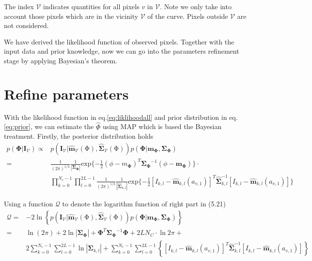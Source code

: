 The index $\mathcal{V}$ indicates quantities for all pixels $v$ in
$\mathcal{V}$. Note we only take into account those pixels which are
in the vicinity $\mathcal{V}$ of the curve. Pixels outside
$\mathcal{V}$ are not considered.

We have derived the likelihood function of observed pixels. Together
with the input data and prior knowledge, now we can go into the parameters
refinement stage by applying Bayesian's theorem.

\section{Refine parameters}
\label{sec:ref}

With the likelihood function in eq.\ref{eq:liklihoodall} and prior distribution in
eq.\ref{eq:prior}, we can estimate the $\hat{\Phi}$ using MAP which is based the
Bayesian treatment.
Firstly, the posterior distribution holds
\begin{align}
\label{eq:costf}
    p(\mathbf{\Phi}|\mathbf{\mathbf{I}}_{\mathcal{V}}) 
    \propto &
    p(\mathbf{\mathbf{I}_{\mathcal{V}}}
    |\hat{\mathbf{\mathbf{m}}}_{\mathcal{V}}(\mathrm{\Phi}),\hat{\mathbf{\mathbf{\Sigma}}}_{\mathcal{V}}(\mathrm{\Phi}))p(\mathbf{\Phi}
    | \mathbf{m}_{\mathbf{\Phi}},
    \mathbf{\mathbf{\Sigma}}_{\mathbf{\Phi}})\nonumber\\
    = & {\frac{1}{{(2\pi)}^{1/2}}}
      \frac{1}{|\mathbf{\Sigma}_{\mathbf{\Phi}}|}
      \mathrm{exp}\{-\frac{1}{2}{(\phi-m_{\mathbf{\Phi}})^T{\mathbf{\Sigma}_{\mathbf{\Phi}}}^{-1}(\phi-\mathbf{m}_{\mathbf{\Phi}})}\}\cdot
    \nonumber\\ 
    & \prod_{k = 0}^{N_{c}-1} \prod_{l=0}^{2L-1}{\frac{1}{(2\pi)^{1/2}}
        \frac{1}{|\hat{\mathbf{\Sigma}}_{k,l}|} \mathrm{exp}\{-\frac{1}{2}
        {\left[I_{k,l}-\hat{\mathbf{m}}_{k,l}(a_{v,1})\right]^T\hat{\mathbf{\Sigma}}_{k,l}^{-1}\left[I_{k,l}-\hat{\mathbf{m}}_{k,l}(a_{v,1})\right]}
      }\}
\end{align}

Using a function $\mathcal{Q}$ to denote the logarithm function
of right part in (5.21)
\begin{align}
  \label{eq:costd}
  \mathcal{Q} = & -2 \ln \left\{  p(\mathbf{\mathbf{I}_{\mathcal{V}}}
    |\hat{\mathbf{\mathbf{m}}}_{\mathcal{V}}(\mathrm{\Phi}),\hat{\mathbf{\mathbf{\Sigma}}}_{\mathcal{V}}(\mathrm{\Phi}))p(\mathbf{\Phi}
    | \mathbf{m}_{\mathbf{\Phi}},
    \mathbf{\mathbf{\Sigma}}_{\mathbf{\Phi}})\right\}\nonumber\\
 = & \ln{(2\pi)} + 2\ln{|\mathbf{\Sigma}_{\mathbf{\Phi}}|} +
 {\mathbf{\Phi}}^T{\mathbf{\Sigma}_{\mathbf{\Phi}}}^{-1}\mathbf{\Phi}
 + 2LN_{C} \cdot \ln{2\pi} + \nonumber \\
& 2\sum_{k = 0}^{N_{c}-1} \sum_{l=0}^{2L-1}{\ln{|\mathbf{\Sigma}_{k,l}|}} + \sum_{k = 0}^{N_{c}-1} \sum_{l=0}^{2L-1}
\left\{{\left[I_{k,l}-\hat{\mathbf{m}}_{k,l}(a_{v,1})\right]^T\hat{\mathbf{\Sigma}}_{k,l}^{-1}\left[I_{k,l}-\hat{\mathbf{m}}_{k,l}(a_{v,1})\right]}\right\}
\end{align}

